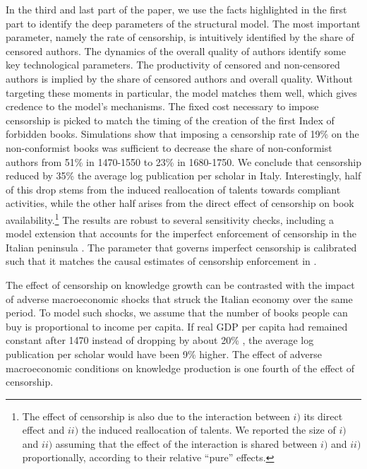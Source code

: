 In the third and last part of the paper, we use the facts highlighted in the first part to identify the deep parameters of the structural model. The most important parameter, namely the rate of censorship, is intuitively identified by the share of censored authors. The dynamics of the overall quality of authors identify some key technological parameters.  The productivity of censored and non-censored authors is implied by the share of censored authors and overall quality. Without targeting these moments in particular, the model  matches them well, which gives credence to the  model's mechanisms. The fixed cost necessary to impose censorship is picked to match the timing of the creation of the first Index of forbidden books. Simulations show that imposing a censorship rate of 19\% on the non-conformist books was sufficient to decrease the share of non-conformist authors from 51\% in 1470-1550 to 23\% in 1680-1750. We conclude that censorship reduced by 35\% the average log publication per scholar in Italy. Interestingly, half of this drop stems from the induced reallocation of talents towards compliant activities, while the other half arises from the direct effect of censorship on book availability.\footnote{The effect of censorship is also due to the interaction between $i)$ its direct effect and $ii)$ the induced reallocation of talents. We reported the size of $i)$ and $ii)$ assuming that the effect of the interaction is shared between $i)$ and $ii)$ proportionally, according to their relative ``pure'' effects.} The results are robust to several sensitivity checks, including a model extension that accounts for the imperfect enforcement of censorship in the Italian peninsula \cite{putnam1906}. The parameter that governs imperfect censorship is calibrated such that it matches the causal estimates of censorship enforcement in .

The effect of censorship on knowledge growth can be contrasted with the impact of adverse macroeconomic shocks that struck the Italian economy over the same period. To model such shocks, we assume that the number of books people can buy is proportional to income per capita. If real GDP per capita had remained constant after 1470 instead of dropping by about 20\% \cite{malanima2011long},  the average log publication per scholar  would have been 9\% higher. The effect of adverse macroeconomic conditions on knowledge production is one fourth of  the effect of censorship.




